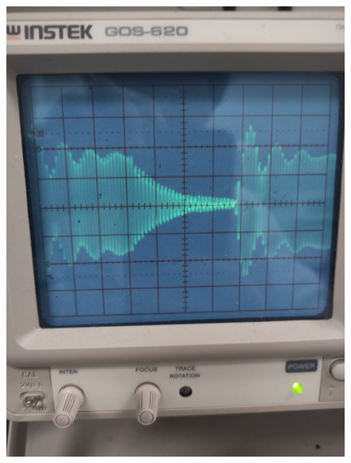 \documentclass[a4paper, 12pt]{article}%
\begin{document}
\begin{enumerate}
\begin{figure}[h!]
\centering
\includegraphics[scale=0.3]{img1.jpg}
\label{fig:Image1}
\end{figure}

\end{enumerate}
\end{document}
